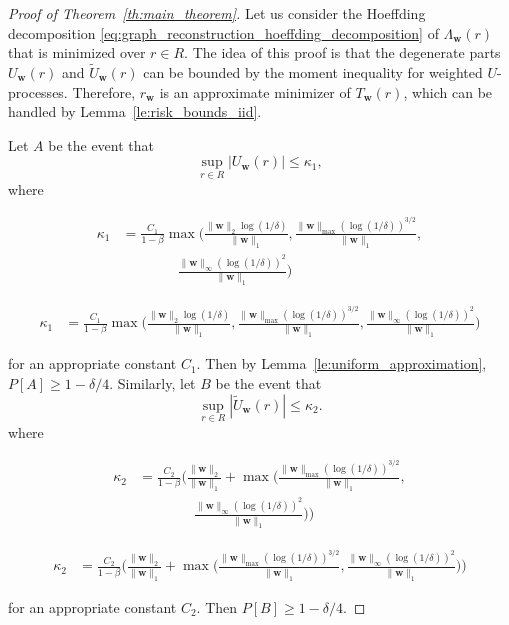 \documentclass[letterpaper]{article} %
\def\DoubleColumn{}
\def\DoubleColumnEnd{}
\def\SingleColumn{}
\def\SingleColumnEnd{}
\newcommand{\Pro}{P}
\newcommand{\weight}{\mathbf{w}}
\newcommand{\normo}[1]{\|#1\|_1}
\newcommand{\complexbound}{\beta}
\newcommand{\red}[1]{\textcolor{red}{#1}}
\newcommand{\todo}[1]{\red{\textsc{todo:} #1}}
\begin{document}
\begin{proof}[Proof of Theorem~\ref{th:main_theorem}]
    Let us consider the Hoeffding decomposition \eqref{eq:graph_reconstruction_hoeffding_decomposition} of $\Lambda_\weight{}(r)$ that is minimized over $r\in R$. The idea of this proof is that the degenerate parts $U_\weight{}(r)$ and $\widetilde{U}_\weight{}(r)$ can be bounded by the moment inequality for weighted $U$-processes. Therefore, $r_\weight{}$ is an approximate minimizer of $T_\weight{}(r)$, which can be handled by Lemma~\ref{le:risk_bounds_iid}.

    Let $A$ be the event that
    \[\sup_{r\in R}|U_\weight{}(r)|\le \kappa_1,\]
    where
    \DoubleColumn
    \begin{align*}
    \kappa_1&=\frac{C_1}{1-\complexbound{}}\max\Big(\frac{\|\weight{}\|_2\log(1/\delta)}{\normo{\weight{}}},\frac{\|\weight{}\|_{\max}(\log(1/\delta))^{3/2}}{\normo{\weight{}}},\\
    &\qquad\qquad \frac{\|\weight{}\|_\infty(\log(1/\delta))^2}{\normo{\weight{}}}\Big)
    \end{align*}
    \DoubleColumnEnd
    \SingleColumn
    \begin{align*}
    \kappa_1&=\frac{C_1}{1-\complexbound{}}\max\Big(\frac{\|\weight{}\|_2\log(1/\delta)}{\normo{\weight{}}},\frac{\|\weight{}\|_{\max}(\log(1/\delta))^{3/2}}{\normo{\weight{}}}, \frac{\|\weight{}\|_\infty(\log(1/\delta))^2}{\normo{\weight{}}}\Big)
    \end{align*}
    \SingleColumnEnd
    for an appropriate constant $C_1$. Then by Lemma~\ref{le:uniform_approximation}, $\Pro[A]\ge 1-\delta/4$. Similarly, let $B$ be the event that
    \[\sup_{r\in R}|\widetilde{U}_\weight{}(r)|\le \kappa_2.\]
    where
    \DoubleColumn
    \begin{align*}
    \kappa_2&=\frac{C_2}{1-\complexbound{}}\Bigg(\frac{\|\weight{}\|_2}{\normo{\weight{}}}+\max\Big(\frac{\|\weight{}\|_{\max}(\log(1/\delta))^{3/2}}{\normo{\weight{}}},\\
    &\qquad\qquad\frac{\|\weight{}\|_\infty(\log(1/\delta))^2}{\normo{\weight{}}}\Big)\Bigg)
    \end{align*}
    \DoubleColumnEnd
    \SingleColumn
    \begin{align*}
    \kappa_2&=\frac{C_2}{1-\complexbound{}}\Bigg(\frac{\|\weight{}\|_2}{\normo{\weight{}}}+\max\Big(\frac{\|\weight{}\|_{\max}(\log(1/\delta))^{3/2}}{\normo{\weight{}}},\frac{\|\weight{}\|_\infty(\log(1/\delta))^2}{\normo{\weight{}}}\Big)\Bigg)
    \end{align*}
    \SingleColumnEnd
    for an appropriate constant $C_2$.
    Then $\Pro[B]\ge 1-\delta/4$.


\end{proof}
\end{document}
